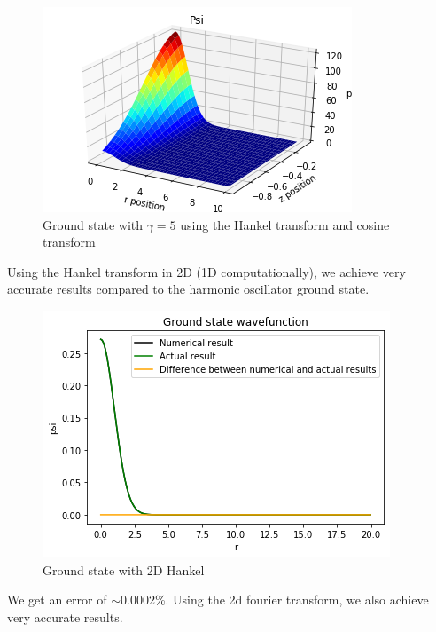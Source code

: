 \documentclass[10pt]{article}
\numberwithin{equation}{section}
\begin{document}
\begin{multicols}{2}
\begin{figure}[H]
\centering
\includegraphics[width=0.8\linewidth]{gndstate3DHankel}
\caption{Ground state with $\gamma=5$ using the Hankel transform and cosine transform}
\end{figure}
	
Using the Hankel transform in 2D (1D computationally), we achieve very accurate results compared to the harmonic oscillator ground state.
\begin{figure}[H]
\centering
\includegraphics[width=\linewidth]{hankel 2d gnd state}
\caption{Ground state with 2D Hankel}
\end{figure}
We get an error of $\sim$0.0002\%.
Using the 2d fourier transform, we also achieve very accurate results.


\end{multicols}
\end{document}
